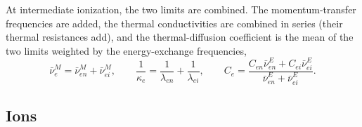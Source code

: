 At intermediate ionization, the two limits are combined. The momentum-transfer frequencies are added, the thermal conductivities are combined in series (their thermal resistances add), and the thermal-diffusion coefficient is the mean of the two limits weighted by the energy-exchange frequencies,
\begin{equation}
\bar\nu^M_e=\bar\nu^M_{en}+\bar\nu^M_{ei},\qquad
\frac{1}{\kappa_e}=\frac{1}{\lambda_{en}}+\frac{1}{\lambda_{ei}},\qquad
C_e=\frac{C_{en}\bar\nu^E_{en}+C_{ei}\bar\nu^E_{ei}}{\bar\nu^E_{en}+\bar\nu^E_{ei}} .
\label{eq:bridge}
\end{equation}
\subsection{Ions}

